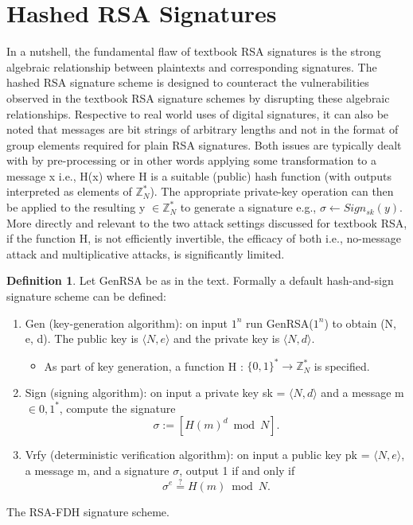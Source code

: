 \documentclass[]{final_report}
\theoremstyle{definition}
\newtheorem{definition}{Definition}[chapter]
\begin{document}
\section{Hashed RSA Signatures}
In a nutshell, the fundamental flaw of textbook RSA signatures is the strong algebraic relationship between plaintexts and corresponding signatures. The hashed RSA signature scheme is designed to counteract the vulnerabilities observed in the textbook RSA signature schemes by disrupting these algebraic relationships. Respective to real world uses of digital signatures, it can also be noted that messages are bit strings of arbitrary lengths and not in the format of group elements required for plain RSA signatures.
Both issues are typically dealt with by pre-processing or in other words applying some transformation to a message x i.e., H(x) where H is a suitable (public) hash function (with outputs interpreted as elements of $\mathbb{Z}^*_{N}$).  The appropriate private-key operation can then be applied to the resulting y $\in \mathbb{Z}^*_{N}$ to generate a signature e.g.,  $\sigma \leftarrow Sign_{sk}(y)$.
More directly and relevant to the two attack settings discussed for textbook RSA, if the function H, is not efficiently invertible, the efficacy of both i.e., no-message attack and multiplicative attacks, is significantly limited.

\begin{definition}
\label{def:hashed rsa}
Let GenRSA be as in the text. Formally a default hash-and-sign signature scheme can be defined:
\begin{enumerate}
    \item Gen (key-generation algorithm): on input $1^n$ run GenRSA($1^n$) to obtain (N, e, d). The public key is $\langle N, e \rangle$ and the private key is $\langle N, d \rangle$.
    \begin{itemize}
    \item As part of key generation, a function H : $\{0, 1\}^* \rightarrow \mathbb{Z}^*_{N}$ is specified.
    \end{itemize}

    \item Sign (signing algorithm): on input a private key sk = $\langle N, d \rangle$ and a message m $\in {0, 1}^*$, compute the signature
\[\sigma := [H(m)^d \bmod N].\]
    \item Vrfy (deterministic verification algorithm):  on input a public key pk = $\langle N, e \rangle$, a message m, and a signature $\sigma$, output 1 if and only if
    \[\sigma^e \stackrel{?}{=} H(m) \bmod N.\]
\end{enumerate}
The RSA-FDH signature scheme.
\end{definition}
\end{document}
